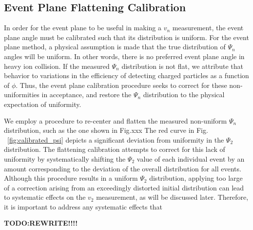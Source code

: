 \subsection{Event Plane Flattening Calibration}
In order for the event plane to be useful in making a $v_n$ measurement, the event plane angle must be calibrated such that its distribution is uniform. For the event plane method, a physical assumption is made that the true
distribution of $\Psi_n$ angles will be uniform. In other words, there is no preferred event plane angle in heavy ion collision. If the measured $\Psi_n$ distribution is not flat, we attribute that behavior to variations in the efficiency of detecting charged particles as a function of $\phi$. Thus, the event plane calibration procedure seeks to correct for these non-uniformities in acceptance, and restore the $\Psi_n$ distribution to the physical expectation of uniformity.


We employ a procedure to re-center and flatten the measured non-uniform $\Psi_n$ distribution, such as the one shown in Fig.xxx 
The red curve in Fig. ~\ref{fig:calibrated_psi} depicts a significant deviation from uniformity in the $\Psi_2$ distribution. The flattening calibration attempts to correct for this 
lack of uniformity by systematically shifting the $\Psi_2$ value of each individual event by an amount corresponding to the deviation of the overall distribution for all events. Although this procedure results in a uniform $\Psi_2$ distribution, applying too large of a correction arising from an exceedingly distorted initial distribution can lead to systematic effects on the $v_2$ measurement, as will be discussed later. Therefore, it is important to address any systematic effects that 

\textbf{TODO:REWRITE!!!!}


